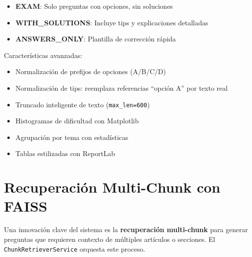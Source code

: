 \documentclass[10pt,twocolumn,letterpaper]{article}
\begin{document}
\begin{itemize}[nosep,leftmargin=*]
  \item \textbf{EXAM}: Solo preguntas con opciones, sin soluciones
  \item \textbf{WITH\_SOLUTIONS}: Incluye tips y explicaciones detalladas
  \item \textbf{ANSWERS\_ONLY}: Plantilla de correcci\'on r\'apida
\end{itemize}

Caracter\'isticas avanzadas:
\begin{itemize}[nosep,leftmargin=*]
  \item Normalizaci\'on de prefijos de opciones (A/B/C/D)
  \item Normalizaci\'on de tips: reemplaza referencias ``opci\'on A'' por texto real
  \item Truncado inteligente de texto (\texttt{max\_len=600})
  \item Histogramas de dificultad con Matplotlib
  \item Agrupaci\'on por tema con estad\'isticas
  \item Tablas estilizadas con ReportLab
\end{itemize}

\section{Recuperaci\'on Multi-Chunk con FAISS}

Una innovaci\'on clave del sistema es la \textbf{recuperaci\'on multi-chunk} para
generar preguntas que requieren contexto de m\'ultiples art\'iculos o secciones.
El \texttt{ChunkRetrieverService} orquesta este proceso.
\end{document}
